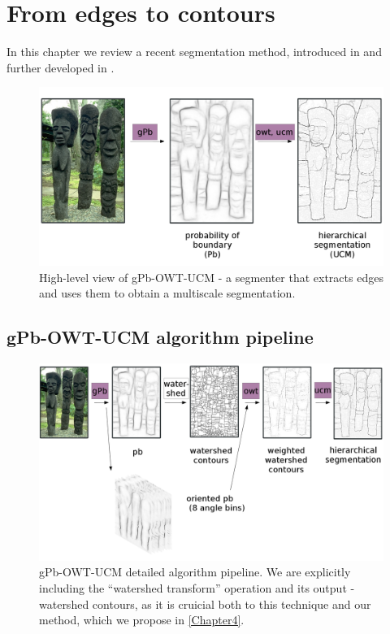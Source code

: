 \chapter{From edges to contours} %
\label{Chapter3}

In this chapter we review a recent segmentation method, introduced in \cite{Arbelaez09} and further developed %
in \cite{Arbelaez11}.

\begin{figure}[ht!]
\centering
 \includegraphics[width=1\textwidth]{images/gPb-OWT-UCM/gPb-OWT-UCM-high-level.png}
\caption[High-level view of gPb-OWT-UCM algorithm]{High-level view of gPb-OWT-UCM - a segmenter that extracts edges and uses them to obtain a multiscale segmentation.}
\label{fig:gPb-OWT-UCM-high-level}
\end{figure}


\section{gPb-OWT-UCM algorithm pipeline}
\begin{figure}[ht!]
\centering
 \includegraphics[width=1\textwidth]{images/gPb-OWT-UCM/gPb-OWT-UCM_pipeline.png}
\caption[gPb-OWT-UCM algorithm detailed pipeline]{gPb-OWT-UCM detailed algorithm pipeline. We are explicitly including the ``watershed transform'' operation and its output - watershed contours, as it is cruicial both to this technique and our method, which we propose in \cref{Chapter4}.}
\label{fig:gPb-OWT-UCM-pipeline}
\end{figure}

